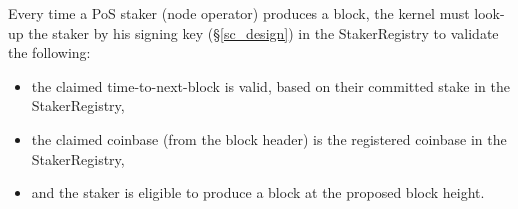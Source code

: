 Every time a PoS staker (node operator) produces a block, the kernel must look-up the staker by his signing key (\S\ref{sc_design}) in the StakerRegistry to validate the following:
\begin{itemize}[label=--,nosep]
    \item the claimed time-to-next-block is valid, based on their committed stake in the StakerRegistry,
    \item the claimed coinbase (from the block header) is the registered coinbase in the StakerRegistry,
    \item and the staker is eligible to produce a block at the proposed block height. 
\end{itemize}
